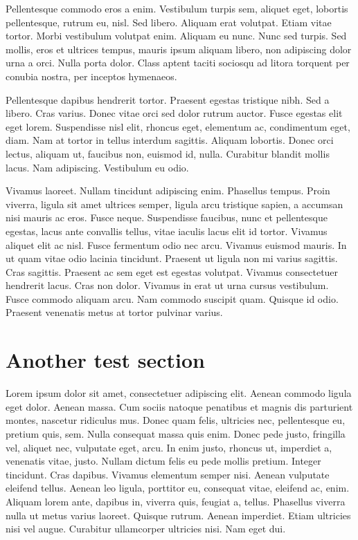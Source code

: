 \begin{multicols}{2}
Pellentesque commodo eros a enim. Vestibulum turpis sem, aliquet eget,
lobortis pellentesque, rutrum eu, nisl. Sed libero. Aliquam erat
volutpat. Etiam vitae tortor. Morbi vestibulum volutpat enim. Aliquam
eu nunc. Nunc sed turpis. Sed mollis, eros et ultrices tempus, mauris
ipsum aliquam libero, non adipiscing dolor urna a orci. Nulla porta
dolor. Class aptent taciti sociosqu ad litora torquent per conubia
nostra, per inceptos hymenaeos.

Pellentesque dapibus hendrerit tortor. Praesent egestas tristique
nibh. Sed a libero. Cras varius. Donec vitae orci sed dolor rutrum
auctor. Fusce egestas elit eget lorem. Suspendisse nisl elit, rhoncus
eget, elementum ac, condimentum eget, diam. Nam at tortor in tellus
interdum sagittis. Aliquam lobortis. Donec orci lectus, aliquam ut,
faucibus non, euismod id, nulla. Curabitur blandit mollis lacus. Nam
adipiscing. Vestibulum eu odio.

Vivamus laoreet. Nullam tincidunt adipiscing enim. Phasellus
tempus. Proin viverra, ligula sit amet ultrices semper, ligula arcu
tristique sapien, a accumsan nisi mauris ac eros. Fusce
neque. Suspendisse faucibus, nunc et pellentesque egestas, lacus ante
convallis tellus, vitae iaculis lacus elit id tortor. Vivamus aliquet
elit ac nisl. Fusce fermentum odio nec arcu. Vivamus euismod
mauris. In ut quam vitae odio lacinia tincidunt. Praesent ut ligula
non mi varius sagittis. Cras sagittis. Praesent ac sem eget est
egestas volutpat. Vivamus consectetuer hendrerit lacus. Cras non
dolor. Vivamus in erat ut urna cursus vestibulum. Fusce commodo
aliquam arcu. Nam commodo suscipit quam. Quisque id odio. Praesent
venenatis metus at tortor pulvinar varius.

\section{Another test section}
Lorem ipsum dolor sit amet, consectetuer adipiscing elit. Aenean
commodo ligula eget dolor. Aenean massa. Cum sociis natoque penatibus
et magnis dis parturient montes, nascetur ridiculus mus. Donec quam
felis, ultricies nec, pellentesque eu, pretium quis, sem. Nulla
consequat massa quis enim. Donec pede justo, fringilla vel, aliquet
nec, vulputate eget, arcu. In enim justo, rhoncus ut, imperdiet a,
venenatis vitae, justo. Nullam dictum felis eu pede mollis pretium.
Integer tincidunt. Cras dapibus. Vivamus elementum semper nisi. Aenean
vulputate eleifend tellus. Aenean leo ligula, porttitor eu, consequat
vitae, eleifend ac, enim. Aliquam lorem ante, dapibus in, viverra
quis, feugiat a, tellus. Phasellus viverra nulla ut metus varius
laoreet. Quisque rutrum. Aenean imperdiet. Etiam ultricies nisi vel
augue. Curabitur ullamcorper ultricies nisi. Nam eget dui.


\end{multicols}
